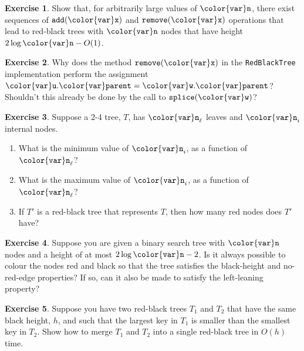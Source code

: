 \documentclass[10pt]{book}
\theoremstyle{plain}
\theoremstyle{definition}
\newtheorem{exc}{Exercise}[chapter]
\newcommand{\exclabel}[1]{\label{exc:#1}}
\begin{document}
\begin{exc}
  Show that, for arbitrarily large values of \ensuremath{\mathtt{{\color{var}n}}}, there exist sequences
  of \ensuremath{\mathtt{add({\color{var}x})}} and \ensuremath{\mathtt{remove({\color{var}x})}} operations that lead to red-black trees
  with \ensuremath{\mathtt{{\color{var}n}}} nodes that have height $2\log \ensuremath{\mathtt{{\color{var}n}}}-O(1)$.
\end{exc}



\begin{exc}
  Why does the method \ensuremath{\mathtt{remove({\color{var}x})}} in the \texttt{RedBlackTree} implementation
  perform the assignment \ensuremath{\mathtt{{\color{var}u}.{\color{var}parent}={\color{var}w}.{\color{var}parent}}}?  Shouldn't this already
  be done by the call to \ensuremath{\mathtt{splice({\color{var}w})}}?
\end{exc}

\begin{exc}
  Suppose a 2-4 tree, $T$, has $\ensuremath{\mathtt{{\color{var}n}}}_\ell$ leaves and $\ensuremath{\mathtt{{\color{var}n}}}_i$ internal nodes.
  \begin{enumerate}
    \item What is the minimum value of $\ensuremath{\mathtt{{\color{var}n}}}_i$, as a function of $\ensuremath{\mathtt{{\color{var}n}}}_\ell$?
    \item What is the maximum value of $\ensuremath{\mathtt{{\color{var}n}}}_i$, as a function of $\ensuremath{\mathtt{{\color{var}n}}}_\ell$?
    \item If $T'$ is a red-black tree that represents $T$, then how many red
     nodes does $T'$ have?
  \end{enumerate}
\end{exc}

\begin{exc}
  Suppose you are given a binary search tree with \ensuremath{\mathtt{{\color{var}n}}} nodes and a
  height of at most $2\log \ensuremath{\mathtt{{\color{var}n}}}-2$.  Is it always possible to colour the
  nodes red and black so that the tree satisfies the black-height and
  no-red-edge properties?  If so, can it also be made to satisfy the
  left-leaning property?
\end{exc}

\begin{exc}\exclabel{redblack-merge}
  Suppose you have two red-black trees $T_1$ and $T_2$ that have the
  same black height, $h$, and such that the largest key in $T_1$ is smaller
  than the smallest key in $T_2$.  Show how to merge $T_1$ and $T_2$
  into a single red-black tree in $O(h)$ time.
\end{exc}
\end{document}
